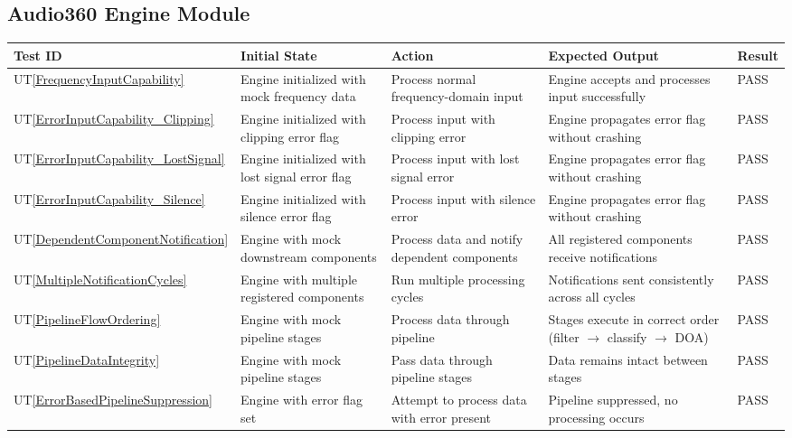 \documentclass[12pt, titlepage]{article}
\newcommand{\utref}[1]{UT\ref{#1}}
\begin{document}
\subsection{Audio360 Engine Module}
{\footnotesize
\begin{longtable}{|p{0.8cm}|p{3.5cm}|p{3.5cm}|p{3.5cm}|p{1cm}|}
    \hline
    \textbf{Test ID} & \textbf{Initial State} & \textbf{Action} &
    \textbf{Expected Output} & \textbf{Result} \\ 
    \endfirsthead
    \hline

    \utref{FrequencyInputCapability} & Engine initialized with mock frequency
    data & Process normal frequency-domain input & Engine accepts and processes
    input successfully & PASS\\ \hline
    \utref{ErrorInputCapability_Clipping} & Engine initialized with clipping
    error flag & Process input with clipping error & Engine propagates error
    flag without crashing & PASS\\ \hline
    \utref{ErrorInputCapability_LostSignal} & Engine initialized with lost
    signal error flag & Process input with lost signal error & Engine propagates
    error flag without crashing & PASS\\ \hline
    \utref{ErrorInputCapability_Silence} & Engine initialized with silence error
    flag & Process input with silence error & Engine propagates error flag
    without crashing & PASS\\ \hline
    \utref{DependentComponentNotification} & Engine with mock downstream
    components & Process data and notify dependent components & All registered
    components receive notifications & PASS\\ \hline
    \utref{MultipleNotificationCycles} & Engine with multiple registered
    components & Run multiple processing cycles & Notifications sent
    consistently across all cycles & PASS\\ \hline
    \utref{PipelineFlowOrdering} & Engine with mock pipeline stages & Process
    data through pipeline & Stages execute in correct order (filter
    $\rightarrow$ classify $\rightarrow$ DOA) & PASS\\ \hline
    \utref{PipelineDataIntegrity} & Engine with mock pipeline stages & Pass data
    through pipeline stages & Data remains intact between stages & PASS\\ \hline
    \utref{ErrorBasedPipelineSuppression} & Engine with error flag set & Attempt
    to process data with error present & Pipeline suppressed, no processing
    occurs & PASS\\ \hline

\end{longtable}}
\end{document}
